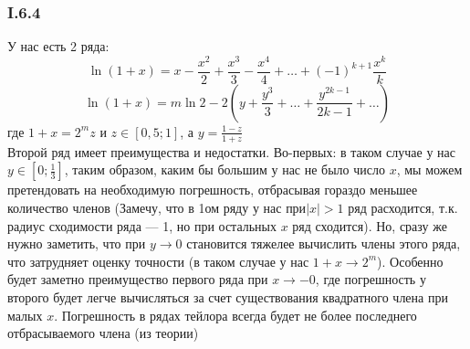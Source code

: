 \subsubsection*{I.6.4}
У нас есть 2 ряда:
$$\ln (1+x) = x - \frac{x^2}{2} + \frac{x^3}{3} - \frac{x^4}{4} + \dots + (-1)^{k+1} \frac{x^k}{k}$$
$$\ln (1+x) = m\ln 2 - 2 \left( y + \frac{y^3}{3} + \dots +  \frac{y^{2k-1}}{2k - 1} + \dots \right)$$
где $1 + x = 2^m z$ и $z \in \left[0,5; 1\right]$, а $y = \frac{1 - z}{1 + z}$\\
Второй ряд имеет преимущества и недостатки. Во-первых: в таком случае у нас $y \in \left[0; \frac{1}{3}\right]$, таким образом, каким бы большим у нас не было число $x$, мы можем претендовать на необходимую погрешность, отбрасывая гораздо меньшее количество членов (Замечу, что в 1ом ряду у нас при$|x|>1$ ряд расходится, т.к. радиус сходимости ряда --- 1, но при остальных $x$ ряд сходится). Но, сразу же нужно заметить, что при $y \rightarrow 0$ становится тяжелее вычислить члены этого ряда, что затрудняет оценку точности (в таком случае у нас $1+x \rightarrow 2^m$). Особенно будет заметно преимущество первого ряда при $x \rightarrow -0$, где погрешность у второго будет легче вычисляться за счет существования квадратного члена при малых $x$. Погрешность в рядах тейлора всегда будет не более последнего отбрасываемого члена (из теории)	